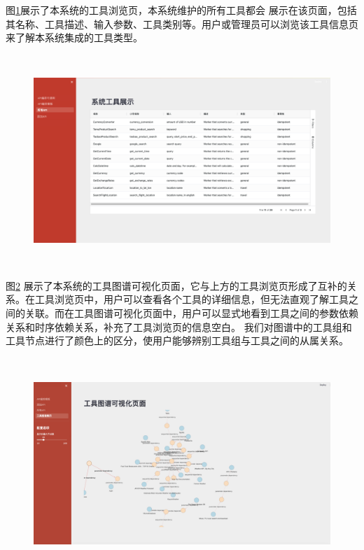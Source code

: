图\ref{fig:ch6-all-tools}展示了本系统的工具浏览页，本系统维护的所有工具都会
展示在该页面，包括其名称、工具描述、输入参数、工具类别等。用户或管理员可以浏览该工具信息页来了解本系统集成的工具类型。

\begin{figure}[H]
  \vspace{1em}
  \centering
  \setlength{\abovecaptionskip}{10pt} %
  \includegraphics[height=8cm]{../assets/ch6-所有API展示.png}
  \label{fig:ch6-all-tools}
\end{figure}

图\ref{fig:ch6-tool-kg} 展示了本系统的工具图谱可视化页面，它与上方的工具浏览页形成了互补的关系。在工具浏览页中，用户可以查看各个工具的详细信息，但无法直观了解工具之间的关联。而在工具图谱可视化页面中，用户可以显式地看到工具之间的参数依赖关系和时序依赖关系，补充了工具浏览页的信息空白。
我们对图谱中的工具组和工具节点进行了颜色上的区分，使用户能够辨别工具组与工具之间的从属关系。

\begin{figure}[H]
  \vspace{1em}
  \centering
  \setlength{\abovecaptionskip}{10pt} %
  \includegraphics[height=8cm]{../assets/ch6-工具图谱可视化.png}
  \label{fig:ch6-tool-kg}
\end{figure}

